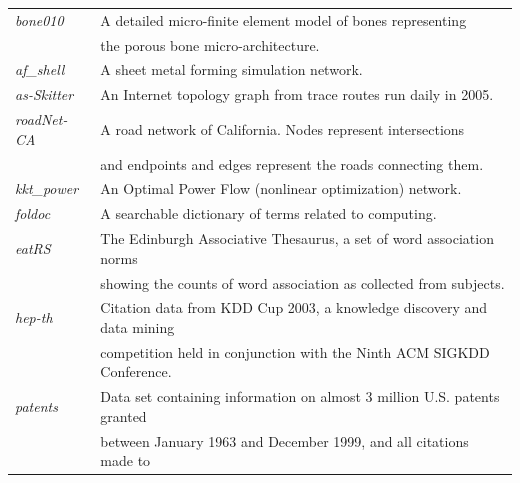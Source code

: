\begin{table}[!h]
\begin{tabular}{ll}
{\it bone010} \cite{vanRietbergen199569} &
A detailed micro-finite element model of bones representing \\
& the porous bone micro-architecture. \\
{\it af\_shell} \cite{Davis97theuniversity}  & A sheet metal forming simulation network. \\ 
{\it as-Skitter} \cite{Leskovec:2005:GOT:1081870.1081893} & An Internet topology graph from trace routes run daily in 2005. \\  %
{\it roadNet-CA} \cite{Leskovec:2005:GOT:1081870.1081893} & A road network of California.
Nodes represent intersections \\ & and endpoints and edges represent the roads connecting them. \\  %
{\it kkt\_power} \cite{Davis97theuniversity} & An Optimal Power Flow (nonlinear optimization) network. \\\hline
{\it foldoc} \cite{foldoc} & A searchable dictionary of terms related to computing. \\
{\it eatRS} \cite{eatRS} & The Edinburgh Associative Thesaurus, a set of word association norms \\
& showing the counts of word association as collected from subjects. \\
{\it hep-th} \cite{hep-th-kdd}	& Citation data from KDD Cup 2003, a knowledge discovery and data mining\\
& competition held in conjunction with the Ninth ACM SIGKDD Conference. \\
{\it patents} \cite{hall2001}	& Data set containing information on almost 3 million U.S. patents granted\\
& between January 1963 and December 1999, and all citations made to\\

\end{tabular}
\end{table}
